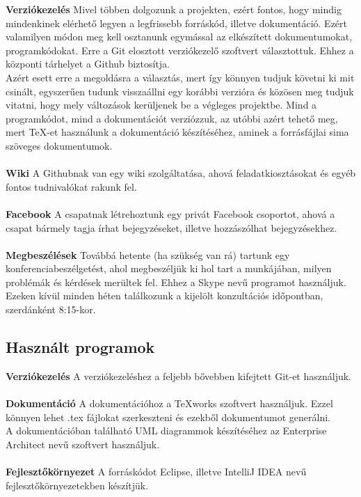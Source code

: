 \textbf{Verziókezelés} Mivel többen dolgozunk a projekten, ezért fontos, hogy mindig mindenkinek elérhető legyen a legfrissebb forráskód, illetve dokumentáció. Ezért valamilyen módon meg kell osztanunk egymással az elkészített dokumentumokat, programkódokat. Erre a Git elosztott verziókezelő szoftvert választottuk. Ehhez a központi tárhelyet a Github biztosítja. \\
Azért esett erre a megoldásra a választás, mert így könnyen tudjuk követni ki mit csinált, egyszerűen tudunk visszaállni egy korábbi verzióra és közösen meg tudjuk vitatni, hogy mely változások kerüljenek be a végleges projektbe.
Mind a programkódot, mind a dokumentációt verziózzuk, az utóbbi azért tehető meg, mert TeX-et használunk a dokumentáció készítéséhez, aminek a forrásfájlai sima szöveges dokumentumok.
\\ \\
\textbf{Wiki}
A Githubnak van egy wiki szolgáltatása, ahová feladatkiosztásokat és egyéb fontos tudnivalókat rakunk fel. \\ \\
\textbf{Facebook}
A csapatnak létrehoztunk egy privát Facebook csoportot, ahová a csapat bármely tagja írhat bejegyzéseket, illetve hozzászólhat bejegyzésekhez. \\ \\
\textbf{Megbeszélések}
Továbbá hetente (ha szükség van rá) tartunk egy konferenciabeszélgetést, ahol megbeszéljük ki hol tart a munkájában, milyen problémák és kérdések merültek fel. Ehhez a Skype nevű programot használjuk. \\
Ezeken kívül minden héten találkozunk a kijelölt konzultációs időpontban, szerdánként 8:15-kor.

\subsection{Használt programok}
\textbf{Verziókezelés}
A verziókezeléshez a feljebb bővebben kifejtett Git-et használjuk. \\ \\
\textbf{Dokumentáció}
A dokumentációhoz a TeXworks szoftvert használjuk. Ezzel könnyen lehet .tex fájlokat szerkeszteni és ezekből dokumentumot generálni. \\
A dokumentációban található UML diagrammok készítéséhez az Enterprise Architect nevű szoftvert használjuk. \\ \\
\textbf{Fejlesztőkörnyezet}
A forráskódot Eclipse, illetve IntelliJ IDEA nevű fejlesztőkörnyezetekben készítjük.

